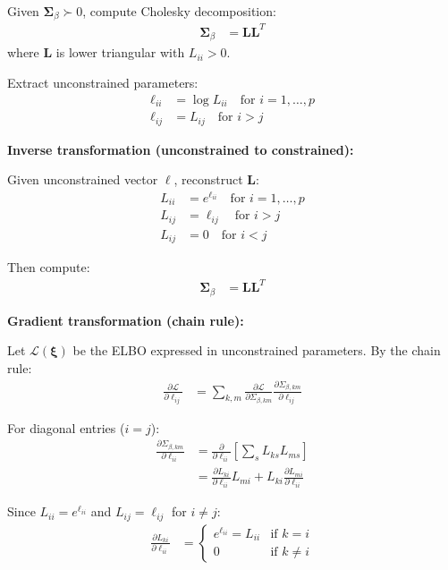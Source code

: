 \documentclass[11pt,a4paper]{article}
\begin{document}
Given $\bm{\Sigma}_\beta \succ 0$, compute Cholesky decomposition:
\begin{align}
\bm{\Sigma}_\beta &= \bm{L}\bm{L}^T
\end{align}
where $\bm{L}$ is lower triangular with $L_{ii} > 0$.

Extract unconstrained parameters:
\begin{align}
\ell_{ii} &= \log L_{ii} \quad \text{for } i=1,\ldots,p\\
\ell_{ij} &= L_{ij} \quad \text{for } i > j
\end{align}

\textbf{Inverse transformation (unconstrained to constrained):}

Given unconstrained vector $\bm{\ell}$, reconstruct $\bm{L}$:
\begin{align}
L_{ii} &= e^{\ell_{ii}} \quad \text{for } i=1,\ldots,p\\
L_{ij} &= \ell_{ij} \quad \text{for } i > j\\
L_{ij} &= 0 \quad \text{for } i < j
\end{align}

Then compute:
\begin{align}
\bm{\Sigma}_\beta &= \bm{L}\bm{L}^T
\end{align}

\textbf{Gradient transformation (chain rule):}

Let $\mathcal{L}(\bm{\xi})$ be the ELBO expressed in unconstrained parameters. By the chain rule:
\begin{align}
\frac{\partial \mathcal{L}}{\partial \ell_{ij}} &= \sum_{k,m} \frac{\partial \mathcal{L}}{\partial \Sigma_{\beta,km}} \frac{\partial \Sigma_{\beta,km}}{\partial \ell_{ij}}
\end{align}

For diagonal entries ($i=j$):
\begin{align}
\frac{\partial \Sigma_{\beta,km}}{\partial \ell_{ii}} &= \frac{\partial}{\partial \ell_{ii}} \left[\sum_s L_{ks} L_{ms}\right]\\
&= \frac{\partial L_{ki}}{\partial \ell_{ii}} L_{mi} + L_{ki} \frac{\partial L_{mi}}{\partial \ell_{ii}}
\end{align}

Since $L_{ii} = e^{\ell_{ii}}$ and $L_{ij} = \ell_{ij}$ for $i \ne j$:
\begin{align}
\frac{\partial L_{ki}}{\partial \ell_{ii}} &= \begin{cases}
e^{\ell_{ii}} = L_{ii} & \text{if } k = i\\
0 & \text{if } k \ne i
\end{cases}
\end{align}
\end{document}
